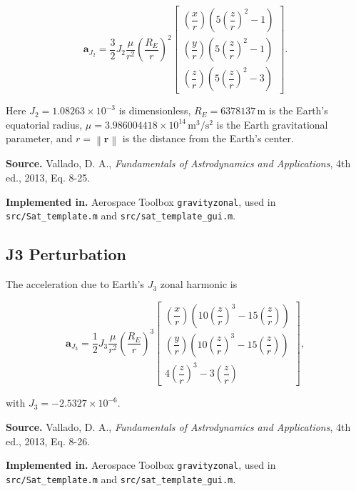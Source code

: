 \documentclass[11pt]{article}
\newcommand{\vect}[1]{\boldsymbol{#1}}
\newcommand{\norm}[1]{\left\lVert #1 \right\rVert}
\begin{document}
\begin{equation}
\vect{a}_{J_2} = \frac{3}{2} J_2 \frac{\mu}{r^2} \left(\frac{R_E}{r}\right)^2
\begin{bmatrix}
\left(\dfrac{x}{r}\right)\left(5\left(\dfrac{z}{r}\right)^2 - 1\right) \\
\left(\dfrac{y}{r}\right)\left(5\left(\dfrac{z}{r}\right)^2 - 1\right) \\
\left(\dfrac{z}{r}\right)\left(5\left(\dfrac{z}{r}\right)^2 - 3\right)
\end{bmatrix}.
\end{equation}

Here $J_2 = 1.08263 \times 10^{-3}$ is dimensionless,
$R_E = 6378137\,\mathrm{m}$ is the Earth's equatorial radius,
$\mu = 3.986004418 \times 10^{14}\,\mathrm{m}^3/\mathrm{s}^2$ is the
Earth gravitational parameter, and $r = \norm{\vect{r}}$ is the distance
from the Earth's center.

\textbf{Source.} Vallado, D. A., \emph{Fundamentals of Astrodynamics and
Applications}, 4th ed., 2013, Eq. 8-25.

\textbf{Implemented in.} Aerospace Toolbox \texttt{gravityzonal}, used in
\texttt{src/Sat\_template.m} and \texttt{src/sat\_template\_gui.m}.

\subsection{J3 Perturbation}

The acceleration due to Earth's $J_3$ zonal harmonic is

\begin{equation}
\vect{a}_{J_3} = \frac{1}{2} J_3 \frac{\mu}{r^2} \left(\frac{R_E}{r}\right)^3
\begin{bmatrix}
\left(\dfrac{x}{r}\right)\left(10\left(\dfrac{z}{r}\right)^3 - 15\left(\dfrac{z}{r}\right)\right) \\
\left(\dfrac{y}{r}\right)\left(10\left(\dfrac{z}{r}\right)^3 - 15\left(\dfrac{z}{r}\right)\right) \\
4\left(\dfrac{z}{r}\right)^3 - 3\left(\dfrac{z}{r}\right)
\end{bmatrix},
\end{equation}

with $J_3 = -2.5327 \times 10^{-6}$.

\textbf{Source.} Vallado, D. A., \emph{Fundamentals of Astrodynamics and
Applications}, 4th ed., 2013, Eq. 8-26.

\textbf{Implemented in.} Aerospace Toolbox \texttt{gravityzonal}, used in
\texttt{src/Sat\_template.m} and \texttt{src/sat\_template\_gui.m}.
\end{document}
